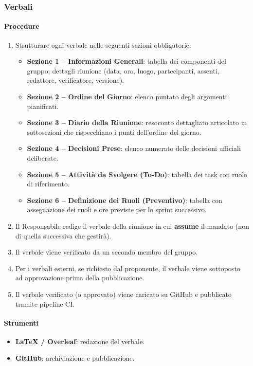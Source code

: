 \documentclass[a4paper, 11pt, oneside]{scrartcl}
\begin{document}
\subsubsection{Verbali}
\label{sec:verbali}

\paragraph{Procedure}
\begin{enumerate}
    \item Strutturare ogni verbale nelle seguenti sezioni obbligatorie:
    \begin{itemize}
        \item \textbf{Sezione 1 – Informazioni Generali}: tabella dei componenti del gruppo; dettagli riunione (data, ora, luogo, partecipanti, assenti, redattore, verificatore, versione).
        \item \textbf{Sezione 2 – Ordine del Giorno}: elenco puntato degli argomenti pianificati.
        \item \textbf{Sezione 3 – Diario della Riunione}: resoconto dettagliato articolato in sottosezioni che rispecchiano i punti dell'ordine del giorno.
        \item \textbf{Sezione 4 – Decisioni Prese}: elenco numerato delle decisioni ufficiali deliberate.
        \item \textbf{Sezione 5 – Attività da Svolgere (To-Do)}: tabella dei task con ruolo di riferimento.
        \item \textbf{Sezione 6 – Definizione dei Ruoli (Preventivo)}: tabella con assegnazione dei ruoli e ore previste per lo sprint successivo.
    \end{itemize}
    \item Il Responsabile redige il verbale della riunione in cui \textbf{assume} il mandato (non di quella successiva che gestirà).
    \item Il verbale viene verificato da un secondo membro del gruppo.
    \item Per i verbali esterni, se richiesto dal proponente, il verbale viene sottoposto ad approvazione prima della pubblicazione.
    \item Il verbale verificato (o approvato) viene caricato su GitHub e pubblicato tramite pipeline CI.
\end{enumerate}

\paragraph{Strumenti}
\begin{itemize}
    \item \textbf{\LaTeX{} / Overleaf}: redazione del verbale.
    \item \textbf{GitHub}: archiviazione e pubblicazione.
\end{itemize}
\end{document}
